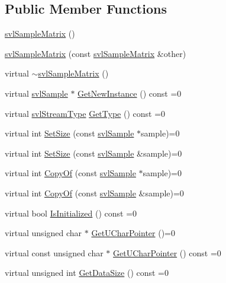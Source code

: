 \subsection*{Public Member Functions}
\begin{DoxyCompactItemize}
\item 
\hyperlink{classsvl_sample_matrix_ac053684aa6277b49aa9f68d641622145}{svl\+Sample\+Matrix} ()
\item 
\hyperlink{classsvl_sample_matrix_a51a547258e24eb19ea67935c48f83396}{svl\+Sample\+Matrix} (const \hyperlink{classsvl_sample_matrix}{svl\+Sample\+Matrix} \&other)
\item 
virtual \hyperlink{classsvl_sample_matrix_a73e88acd74815478e4a9216341998d06}{$\sim$svl\+Sample\+Matrix} ()
\item 
virtual \hyperlink{classsvl_sample}{svl\+Sample} $\ast$ \hyperlink{classsvl_sample_matrix_ac7c333173058407963ec92b23b005aa1}{Get\+New\+Instance} () const =0
\item 
virtual \hyperlink{svl_definitions_8h_aa00696d338a58db361335a01fd11e122}{svl\+Stream\+Type} \hyperlink{classsvl_sample_matrix_a4dd585fd19ce4a963375434dc6b1c4a6}{Get\+Type} () const =0
\item 
virtual int \hyperlink{classsvl_sample_matrix_a69e99b2e031b9de429f8db88c857d074}{Set\+Size} (const \hyperlink{classsvl_sample}{svl\+Sample} $\ast$sample)=0
\item 
virtual int \hyperlink{classsvl_sample_matrix_a552f912e6796d601dfab990eb7b1016c}{Set\+Size} (const \hyperlink{classsvl_sample}{svl\+Sample} \&sample)=0
\item 
virtual int \hyperlink{classsvl_sample_matrix_ab1e1189a007f0f591aeb493c988ed56a}{Copy\+Of} (const \hyperlink{classsvl_sample}{svl\+Sample} $\ast$sample)=0
\item 
virtual int \hyperlink{classsvl_sample_matrix_ad47f87a91a5f7216570bf830c99b084d}{Copy\+Of} (const \hyperlink{classsvl_sample}{svl\+Sample} \&sample)=0
\item 
virtual bool \hyperlink{classsvl_sample_matrix_a8a7d21ce32e6dd031cb0de21db1e555d}{Is\+Initialized} () const =0
\item 
virtual unsigned char $\ast$ \hyperlink{classsvl_sample_matrix_a39ba70cdad8a7b9ecce9558b8754c2f5}{Get\+U\+Char\+Pointer} ()=0
\item 
virtual const unsigned char $\ast$ \hyperlink{classsvl_sample_matrix_a624289ca527d6caa36114161d067fb6d}{Get\+U\+Char\+Pointer} () const =0
\item 
virtual unsigned int \hyperlink{classsvl_sample_matrix_a97eb60a0a58c7ccf020ba2398638153a}{Get\+Data\+Size} () const =0

\end{DoxyCompactItemize}
